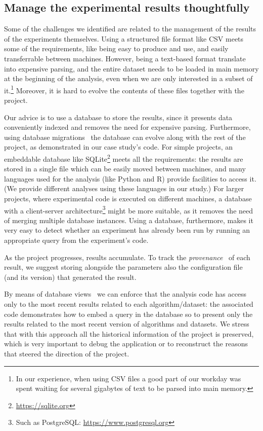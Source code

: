 \documentclass{llncs}
\begin{document}
\subsection{Manage the experimental results thoughtfully}
\label{sec:manage-experiments}

Some of the challenges we identified are related to the management of the results
of the experiments themselves.
Using a structured file format like CSV meets some of the requirements, like being
easy to produce and use, and easily transferrable between machines.
However, being a text-based format translate into expensive parsing, and
the entire dataset needs to be loaded in main memory at the beginning
of the analysis, even when we are only interested in a subset of it.\footnote{
  In our experience, when using CSV files a good part of our workday was spent 
  waiting for several gigabytes of text to be parsed into main memory.
}
Moreover, it is hard to evolve the contents of these files together with 
the project.

Our advice is to use a database to store the results, since it presents data 
conveniently indexed and removes the need for expensive parsing. Furthermore,
using database migrations~\cite{citation-needed} the database can evolve along with
the rest of the project, as demonstrated in our case study's code.
For simple projects, an embeddable database like SQLite\footnote{\url{https://sqlite.org}}
meets all the requirements: the results are stored in a single file which can be easily moved
between machines, and many languages used for the analysis (like Python and R) provide
facilities to access it. (We provide different analyses using these languages in our study.)
For larger projects, where experimental code is executed on different machines, a database with
a client-server architecture\footnote{Such as PostgreSQL: \url{https://www.postgresql.org}} 
might be more suitable, as it removes the need of 
merging multiple database instances.
Using a database, furthermore, makes it very easy to detect whether 
an experiment has already been run by running an appropriate query from the experiment's code.

As the project progresses, results accumulate. To track the
\emph{provenance}~\cite{BunemanKW01} of each result, we suggest storing alongside
the parameters also the configuration file (and its version) that generated the result.

By means of database views~\cite{citation-needed} we can enforce that the analysis code
has access only to the most recent results related to each algorithm/dataset: the associated code
demonstrates how to embed a query in the database so to present only the results related to 
the most recent version of algorithms and datasets.
We stress that with this approach all the historical information of the project is preserved,
which is very important to debug the application or to reconstruct the reasons that
steered the direction of the project.
\end{document}
